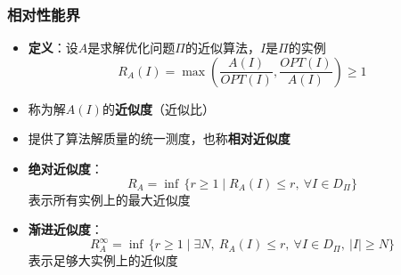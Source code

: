 \documentclass[./../main.tex]{subfiles} %
\begin{document}
\subsubsection{相对性能界}
\begin{itemize}
    \item \textbf{定义}：设$A$是求解优化问题$\Pi$的近似算法，$I$是$\Pi$的实例
    $$
    R_A(I) = \max\left(\frac{A(I)}{OPT(I)}, \frac{OPT(I)}{A(I)}\right) \geq 1
    $$
    
    \item 称为解$A(I)$的\textbf{近似度}（近似比）
    
    \item 提供了算法解质量的统一测度，也称\textbf{相对近似度}
\end{itemize}

\begin{itemize}
    \item \textbf{绝对近似度}：
    $$
    R_A = \inf\,\{r \geq 1 \mid R_A(I) \leq r,\ \forall I \in D_\Pi\}
    $$
    表示所有实例上的最大近似度
    
    \item \textbf{渐进近似度}：
    $$
    R_A^\infty = \inf\,\{r \geq 1 \mid \exists N,\ R_A(I) \leq r,\ \forall I \in D_\Pi,\ |I| \geq N\}
    $$
    表示足够大实例上的近似度
\end{itemize}
\end{document}
